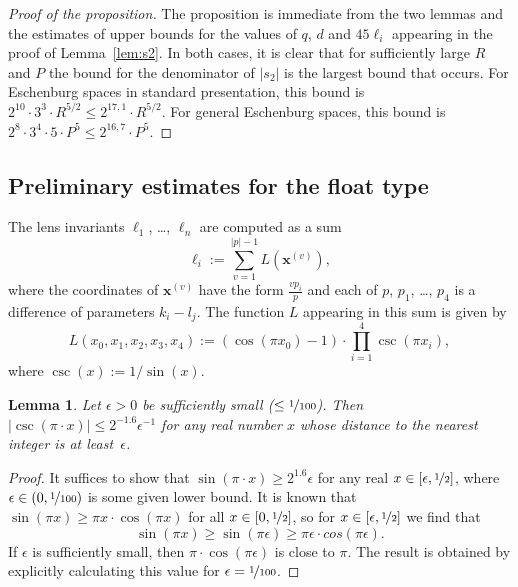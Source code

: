 \documentclass{article}
\newtheorem{lem}[thm]{Lemma}
\newcommand{\abs}[1]{\left|#1\right|}
\renewcommand{\vec}[1]{\mathbf{#1}}
\begin{document}
\begin{proof}[Proof of the proposition]
The proposition is immediate from the two lemmas and the estimates of upper bounds for the values of \(q\), \(d\) and \(45\ell_i\) appearing in the proof of Lemma~\ref{lem:s2}.  In both cases, it is clear that for sufficiently large \(R\) and \(P\) the bound for the denominator of \(\abs{s_2}\) is the largest bound that occurs.  For Eschenburg spaces in standard presentation, this bound is 
\(
2^{10}·3^3·R^{5/2} \leq 2^{17,1}·R^{5/2}.
\)
For general Eschenburg spaces, this bound is
\(
    2^{8}·3^4·5·P^{5} \leq 2^{16,7}·P^5
\).
\end{proof}


\subsection{Preliminary estimates for the float type}

The lens invariants \(\ell_1\), \dots, \(\ell_n\) are computed as a sum
\begin{equation}\label{eq:ell}
  \ell_i := \sum_{v=1}^{\abs{p}-1} L(\vec x^{(v)}),
\end{equation}
where the coordinates of \(\vec x^{(v)}\) have the form \(\frac{v p_i}{p}\) and each of \(p\), \(p_1\), \dots, \(p_4\) is a difference of parameters \(k_i-l_j\).  The function \(L\) appearing in this sum is given by 
\begin{equation}\label{eq:L}
  L(x_0,x_1,x_2,x_3,x_4) 
  := (\cos(\pi x_0)-1)
  · \textstyle\prod_{i=1}^{4} \csc(\pi x_i),
\end{equation}
where \(\csc(x) := 1/\sin(x)\).

\begin{lem}
  Let \(\epsilon>0\) be sufficiently small (\(\leq \nicefrac{1}{100}\)).  Then
  \(\abs{\csc(\pi·x)} \leq 2^{-1.6} \epsilon^{-1}\) for any real number \(x\) whose distance to the nearest integer is at least~\(\epsilon\).
\end{lem}
\begin{proof}
  It suffices to show that \(\sin(\pi·x) \geq 2^{1.6} \epsilon\) for any real \(x\in [\epsilon,\nicefrac{1}{2}]\), where \(\epsilon \in (0,\nicefrac{1}{100})\) is some given lower bound.  It is known that \(\sin(\pi x) \geq \pi x·\cos(\pi x)\) for all \(x\in [0,\nicefrac{1}{2}]\), so for \(x\in [\epsilon,\nicefrac{1}{2}]\) we find that 
  \[
    \sin(\pi x) \geq \sin(\pi\epsilon) \geq \pi\epsilon·cos(\pi\epsilon).
  \]
  If \(\epsilon\) is sufficiently small, then \(\pi·\cos(\pi\epsilon)\) is close to \(\pi\).
  The result is obtained by explicitly calculating this value for \(\epsilon = \nicefrac{1}{100}\).
%
%
\end{proof}
\end{document}
